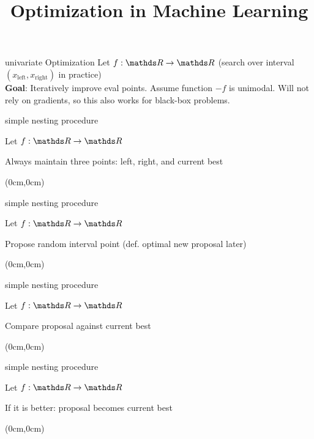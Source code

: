 \documentclass[11pt,compress,t,notes=noshow, xcolor=table]{beamer}
\title{Optimization in Machine Learning}
\newcommand{\xleft}{x_{\text{left}}} %
\newcommand{\xright}{x_{\text{right}}} %
\begin{document}

\begin{frame2}{univariate Optimization}
Let $f: \R \to \R$ (search over interval $(\xleft,\xright)$ in practice)\\
\lz 
\textbf{Goal}: Iteratively improve eval points. Assume function $-f$ is unimodal. Will not rely on gradients, so this also works for black-box problems.
\end{frame2}

\begin{framei}{simple nesting procedure}
\item Let $f: \R \to \R$
\item Always maintain three points: left, right, and current best
\begin{textblock*}{\linewidth}(0cm,0cm)
\end{textblock*}
\end{framei}

\begin{framei}{simple nesting procedure}
\item Let $f: \R \to \R$
\item Propose random interval point (def. optimal new proposal later)
\begin{textblock*}{\linewidth}(0cm,0cm)
\end{textblock*}
\end{framei}

\begin{framei}{simple nesting procedure}
\item Let $f: \R \to \R$
\item Compare proposal against current best
\begin{textblock*}{\linewidth}(0cm,0cm)
\end{textblock*}
\end{framei}

\begin{framei}{simple nesting procedure}
\item Let $f: \R \to \R$
\item If it is better: proposal becomes current best
\begin{textblock*}{\linewidth}(0cm,0cm)
\end{textblock*}
\end{framei}
\end{document}
